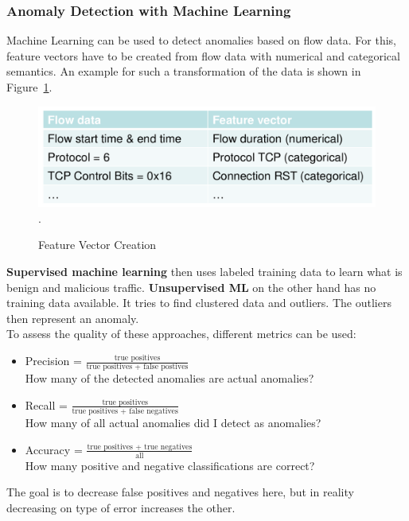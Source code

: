 \subsubsection*{Anomaly Detection with Machine Learning}
Machine Learning can be used to detect anomalies based on flow data.
For this, feature vectors have to be created from flow data with numerical and categorical semantics.
An example for such a transformation of the data is shown in Figure~\ref{fig:ml_feature_vector_creation}.
\begin{figure}[h]
  \centering
  \includegraphics[width=.7\textwidth]{figures/ml_feature_vector_creation}.
  \caption{Feature Vector Creation}\label{fig:ml_feature_vector_creation}
\end{figure}

\textbf{Supervised machine learning} then uses labeled training data to learn what is benign and malicious traffic.
\textbf{Unsupervised ML} on the other hand has no training data available.
It tries to find clustered data and outliers.
The outliers then represent an anomaly.\\

To assess the quality of these approaches, different metrics can be used:
\begin{itemize}
  \item Precision = $\frac{\text{true positives}}{\text{true positives + false postives}}$\\
    How many of the detected anomalies are actual anomalies?
  \item Recall = $\frac{\text{true positives}}{\text{true positives + false negatives}}$\\
    How many of all actual anomalies did I detect as anomalies?
  \item Accuracy = $\frac{\text{true positives + true negatives}}{\text{all}}$\\
    How many positive and negative classifications are correct?
\end{itemize}
The goal is to decrease false positives and negatives here, but in reality decreasing on type of error increases the other.

